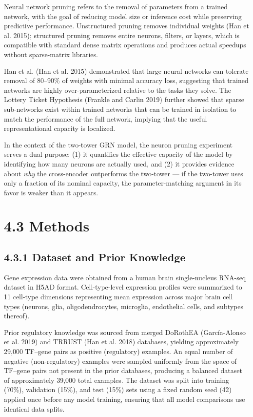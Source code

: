 \documentclass[
  12pt,
]{report}
\begin{document}
Neural network pruning refers to the removal of parameters from a
trained network, with the goal of reducing model size or inference cost
while preserving predictive performance. Unstructured pruning removes
individual weights (Han et al. 2015); structured pruning removes entire
neurons, filters, or layers, which is compatible with standard dense
matrix operations and produces actual speedups without sparse-matrix
libraries.

Han et al. (Han et al. 2015) demonstrated that large neural networks can
tolerate removal of 80--90\% of weights with minimal accuracy loss,
suggesting that trained networks are highly over-parameterized relative
to the tasks they solve. The Lottery Ticket Hypothesis (Frankle and
Carlin 2019) further showed that sparse sub-networks exist within
trained networks that can be trained in isolation to match the
performance of the full network, implying that the useful
representational capacity is localized.

In the context of the two-tower GRN model, the neuron pruning experiment
serves a dual purpose: (1) it quantifies the effective capacity of the
model by identifying how many neurons are actually used, and (2) it
provides evidence about \emph{why} the cross-encoder outperforms the
two-tower --- if the two-tower uses only a fraction of its nominal
capacity, the parameter-matching argument in its favor is weaker than it
appears.

\section{4.3 Methods}\label{methods}

\subsection{4.3.1 Dataset and Prior
Knowledge}\label{dataset-and-prior-knowledge}

Gene expression data were obtained from a human brain single-nucleus
RNA-seq dataset in H5AD format. Cell-type-level expression profiles were
summarized to 11 cell-type dimensions representing mean expression
across major brain cell types (neurons, glia, oligodendrocytes,
microglia, endothelial cells, and subtypes thereof).

Prior regulatory knowledge was sourced from merged DoRothEA
(García-Alonso et al. 2019) and TRRUST ({Han et al.} 2018) databases,
yielding approximately 29,000 TF--gene pairs as positive (regulatory)
examples. An equal number of negative (non-regulatory) examples were
sampled uniformly from the space of TF--gene pairs not present in the
prior databases, producing a balanced dataset of approximately 39,000
total examples. The dataset was split into training (70\%), validation
(15\%), and test (15\%) sets using a fixed random seed (42) applied once
before any model training, ensuring that all model comparisons use
identical data splits.
\end{document}
